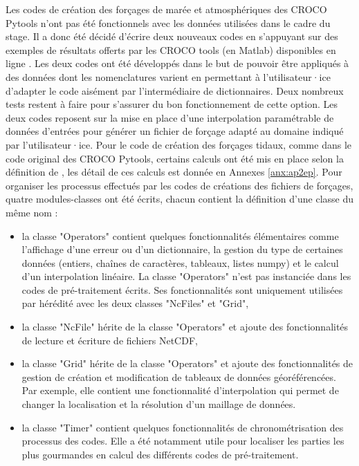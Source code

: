 \documentclass[10pt,a4paper,titlepage]{article}
\begin{document}
Les codes de création des forçages de marée et atmosphériques des CROCO Pytools n'ont pas été fonctionnels avec les données utilisées dans le cadre du stage.
Il a donc été décidé d'écrire deux nouveaux codes en s'appuyant sur des exemples de résultats offerts par les CROCO tools (en Matlab) disponibles en ligne \cite{croco_files_examples}.
Les deux codes ont été développés dans le but de pouvoir être appliqués à des données dont les nomenclatures varient en permettant à l'utilisateur·ice d'adapter le code aisément par l'intermédiaire de dictionnaires.
Deux nombreux tests restent à faire pour s'assurer du bon fonctionnement de cette option.
Les deux codes reposent sur la mise en place d'une interpolation paramétrable de données d'entrées pour générer un fichier de forçage adapté au domaine indiqué par l'utilisateur·ice.
Pour le code de création des forçages tidaux, comme dans le code original des CROCO Pytools, certains calculs ont été mis en place selon la définition de \cite{ap2ep}, les détail de ces calculs est donnée en Annexes \ref{anx:ap2ep}.
Pour organiser les processus effectués par les codes de créations des fichiers de forçages, quatre modules-classes ont été écrits, chacun contient la définition d'une classe du même nom :
\begin{itemize}
    \item la classe "Operators" contient quelques fonctionnalités élémentaires comme l'affichage d'une erreur ou d'un dictionnaire, la gestion du type de certaines données (entiers, chaînes de caractères, tableaux, listes numpy) et le calcul d'un interpolation linéaire.
    La classe "Operators" n'est pas instanciée dans les codes de pré-traitement écrits.
    Ses fonctionnalités sont uniquement  utilisées par hérédité avec les deux classes "NcFiles" et "Grid",
    \item la classe "NcFile" hérite de la classe "Operators" et ajoute des fonctionnalités de lecture et écriture de fichiers NetCDF,
    \item la classe "Grid" hérite de la classe "Operators" et ajoute des fonctionnalités de gestion de création et modification de tableaux de données géoréférencées.
    Par exemple, elle contient une fonctionnalité d'interpolation qui permet de changer la localisation et la résolution d'un maillage de données.
    \item la classe "Timer" contient quelques fonctionnalités de chronométrisation des processus des codes.
    Elle a été notamment utile pour localiser les parties les plus gourmandes en calcul des différents codes de pré-traitement.
\end{itemize}
\end{document}
